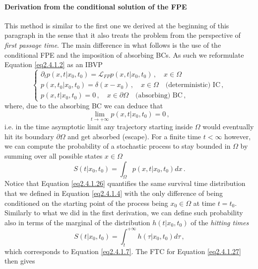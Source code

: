 \documentclass[../main.tex]{subfiles}
\begin{document}
\paragraph{Derivation from the conditional solution of the FPE}
This method is similar to the first one we derived at the beginning of this paragraph in the sense that it also treats the problem from the perspective of \textit{first passage time}.
The main difference in what follows is the use of the conditional FPE and the imposition of absorbing BCs.
As such we reformulate Equation \eqref{eq2.4.1.2} as an IBVP
\begin{equation}\label{eq2.4.1.25}
   \begin{cases}
      \partial_{t}p(x,t|x_{0}, t_{0})=\mathcal{L}_{FP}p(x,t|x_{0},t_{0}) \,,\quad x\in\Omega \\
      p(x,t_{0}|x_{0},t_{0})=\delta(x-x_{0}) \,,\quad x\in\Omega\quad\text{(deterministic) IC}\,, \\
      p(x,t|x_{0}, t_{0})=0\,,\quad x\in\partial\Omega\quad\text{(absorbing) BC}\,,
   \end{cases}
\end{equation}
where, due to the absorbing BC we can deduce that
\begin{equation*}
        \lim_{t\to+\infty}p(x,t|x_{0},t_{0})=0\,,
\end{equation*}
i.e. in the time asymptotic limit any trajectory starting inside $\Omega$ would eventually hit its boundary $\partial\Omega$ and get absorbed (escape).
For a finite time $t<\infty$ however, we can compute the probability of a stochastic process to stay bounded in $\Omega$ by summing over all possible states $x\in\Omega$
\begin{equation}\label{eq2.4.1.26}
     S(t|x_{0},t_{0})=\int_{\Omega}^{}p(x,t|x_{0},t_{0})dx\,.
\end{equation}
Notice that Equation \eqref{eq2.4.1.26} quantifies the same survival time distribution that we defined in Equation \eqref{eq2.4.1.4} with the only difference of being conditioned on the starting point of the process being $x_{0}\in\Omega$ at time $t=t_{0}$.
Similarly to what we did in the first derivation, we can define such probability also in terms of the marginal of the distribution $h(t|x_{0},t_{0})$ of the \textit{hitting times}
\begin{equation}\label{eq2.4.1.27}
     S(t|x_{0},t_{0})=\int_{t}^{+\infty}h(\tau|x_{0},t_{0})d\tau\,,
\end{equation}
which corresponds to Equation \eqref{eq2.4.1.7}.
The FTC for Equation \eqref{eq2.4.1.27} then gives
\end{document}
